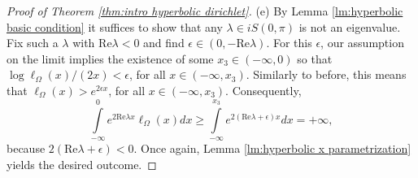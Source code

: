 \documentclass[10pt,a4paper]{amsart}
\begin{document}
\begin{proof}[Proof of Theorem \ref{thm:intro hyperbolic dirichlet}]
		(e) By Lemma \ref{lm:hyperbolic basic condition} it suffices to show that any $\lambda\in iS(0,\pi)$ is not an eigenvalue. Fix such a $\lambda$ with $\mathrm{Re}\lambda<0$ and find $\epsilon\in(0,-\mathrm{Re}\lambda)$. For this $\epsilon$, our assumption on the limit implies the existence of some $x_3\in(-\infty,0)$ so that $\log\ell_\Omega(x)/(2x)<\epsilon$, for all $x\in(-\infty,x_3)$. Similarly to before, this means that $\ell_\Omega(x)>e^{2\epsilon x}$, for all $x\in(-\infty,x_3)$. Consequently,
		\begin{equation*}
			\int\limits_{-\infty}^{0}e^{2\mathrm{Re}\lambda x}\ell_\Omega(x)dx\ge\int\limits_{-\infty}^{x_3}e^{2(\mathrm{Re}\lambda+\epsilon)x}dx=+\infty,
		\end{equation*}
		because $2(\mathrm{Re}\lambda+\epsilon)<0$. Once again, Lemma \ref{lm:hyperbolic x parametrization} yields the desired outcome.
	\end{proof}
\end{document}
